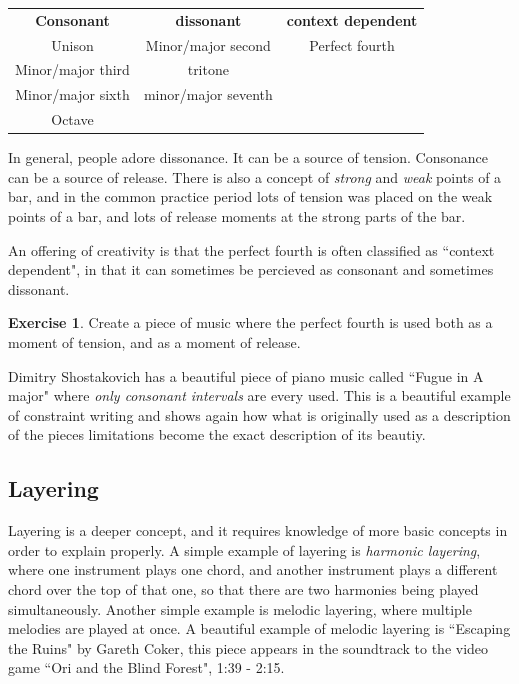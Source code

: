 \documentclass[12pt]{book}
\theoremstyle{plain}
\theoremstyle{definition}
\newtheorem{exercise}[thm]{Exercise}
\begin{document}
\begin{center}
	\begin{tabular}{| c | c | c |}
		\hline
		\textbf{Consonant} & \textbf{dissonant} & \textbf{context dependent}\\
		Unison & Minor/major second & Perfect fourth\\
		Minor/major third & tritone & \\
		Minor/major sixth & minor/major seventh\\
		Octave & & \\
		\hline
		\end{tabular}
	\end{center}

In general, people adore dissonance. It can be a source of tension. Consonance can be a source of release. There is also a concept of \emph{strong} and \emph{weak} points of a bar, and in the common practice period lots of tension was placed on the weak points of a bar, and lots of release moments at the strong parts of the bar.

An offering of creativity is that the perfect fourth is often classified as ``context dependent", in that it can sometimes be percieved as consonant and sometimes dissonant.

\begin{exercise}
	Create a piece of music where the perfect fourth is used both as a moment of tension, and as a moment of release.
	\end{exercise}

Dimitry Shostakovich has a beautiful piece of piano music called ``Fugue in A major" where \emph{only consonant intervals} are every used. This is a beautiful example of constraint writing and shows again how what is originally used as a description of the pieces limitations become the exact description of its beautiy.

\subsection{Layering}

Layering is a deeper concept, and it requires knowledge of more basic concepts in order to explain properly. A simple example of layering is \emph{harmonic layering}, where one instrument plays one chord, and another instrument plays a different chord over the top of that one, so that there are two harmonies being played simultaneously. Another simple example is melodic layering, where multiple melodies are played at once. A beautiful example of melodic layering is ``Escaping the Ruins" by Gareth Coker, this piece appears in the soundtrack to the video game ``Ori and the Blind Forest", 1:39 - 2:15.
\end{document}
